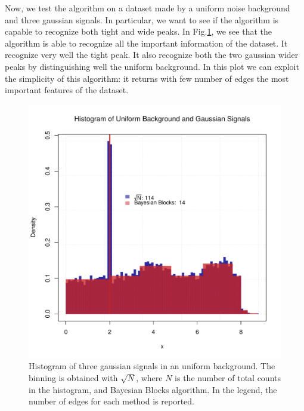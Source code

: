 \documentclass[prb,twocolumn]{revtex4-1}
\begin{document}
Now, we test the algorithm on a dataset made by a uniform noise background and three gaussian signals. In particular, we want to see if the algorithm is capable to recognize both tight and wide peaks.
In Fig.\ref{fig:unif_background}, we see that the algorithm is able to recognize all the important information of the dataset. It recognize very well the tight peak. It also recognize both the two gaussian wider peaks by distinguishing well the uniform background. In this plot we can exploit the simplicity of this algorithm: it returns with few number of edges the most important features of the dataset.

\begin{figure}[h!]
    \centering
    \includegraphics[width=0.9\columnwidth]{images/unif_background.pdf}
    \caption{Histogram of three gaussian signals in an uniform background. The binning is obtained with $\sqrt{N}$, where $N$ is the number of total counts in the histogram, and Bayesian Blocks algorithm.
    In the legend, the number of edges for each method is reported.}
    \label{fig:unif_background}
\end{figure}
\end{document}
